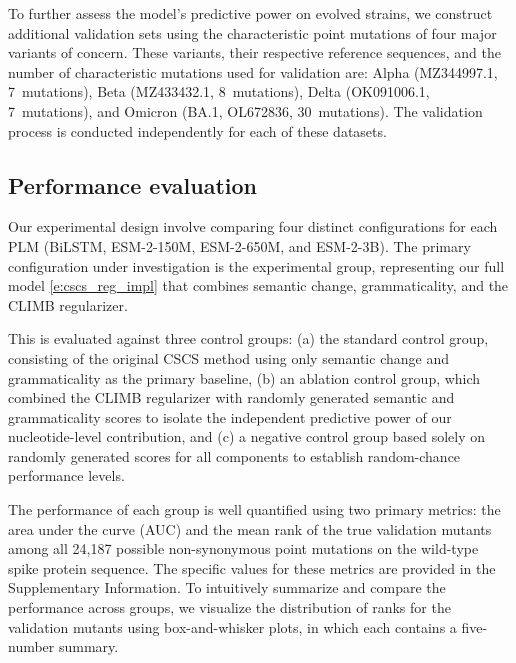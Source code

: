\documentclass[pdflatex,sn-nature]{sn-jnl}
\begin{document}
To further assess the model's predictive power on evolved strains, we construct additional validation sets using the characteristic point mutations of four major variants of concern.
These variants, their respective reference sequences, and the number of characteristic mutations used for validation are:
Alpha (MZ344997.1, 7~mutations), Beta (MZ433432.1, 8~mutations), Delta (OK091006.1, 7~mutations), and Omicron (BA.1, OL672836, 30~mutations).
The validation process is conducted independently for each of these datasets.

%
%
\subsection*{Performance evaluation}

Our experimental design involve comparing four distinct configurations for each PLM (BiLSTM, ESM-2-150M, ESM-2-650M, and ESM-2-3B).
The primary configuration under investigation is the experimental group, representing our full model \eqref{e:cscs_reg_impl} that combines semantic change, grammaticality, and the CLIMB regularizer.

This is evaluated against three control groups:
(a) the standard control group, consisting of the original CSCS method using only semantic change and grammaticality as the primary baseline,
(b) an ablation control group, which combined the CLIMB regularizer with randomly generated semantic and grammaticality scores to isolate the independent predictive power of our nucleotide-level contribution, and
(c) a negative control group based solely on randomly generated scores for all components to establish random-chance performance levels.


The performance of each group is well quantified using two primary metrics: the area under the curve (AUC) and the mean rank of the true validation mutants among all 24,187 possible non-synonymous point mutations on the wild-type spike protein sequence.
The specific values for these metrics are provided in the Supplementary Information.
To intuitively summarize and compare the performance across groups, we visualize the distribution of ranks for the validation mutants using box-and-whisker plots, in which each contains a five-number summary.
\end{document}

